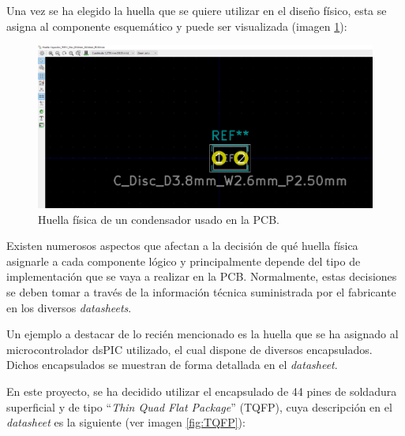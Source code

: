 Una vez se ha elegido la huella que se quiere utilizar en el diseño físico, esta se asigna al componente esquemático y puede ser visualizada (imagen \ref{fig:Huella_Condensador}):


\begin{figure}[H]
\centering 
\includegraphics[width=\linewidth]{pictures/huellaCondensador.PNG}
\caption{Huella física  de un condensador usado en la \ac{PCB}.}
\label{fig:Huella_Condensador}
\end{figure}

Existen numerosos aspectos que afectan a la decisión de qué huella física asignarle a cada componente lógico y principalmente depende del tipo de implementación que se vaya a realizar en la \ac{PCB}. Normalmente, estas decisiones se deben tomar a través de la información técnica suministrada por el fabricante en los diversos \textit{datasheets}.

Un ejemplo a destacar de lo recién mencionado es la huella que se ha asignado al microcontrolador dsPIC utilizado, el cual dispone de diversos encapsulados. Dichos encapsulados se muestran de forma detallada en el \textit{datasheet}.

En este proyecto, se ha decidido utilizar el encapsulado de 44 pines de soldadura superficial y de tipo ``\textit{Thin Quad Flat Package}'' (TQFP), cuya descripción en el \textit{datasheet} es la siguiente (ver imagen \ref{fig:TQFP}):

